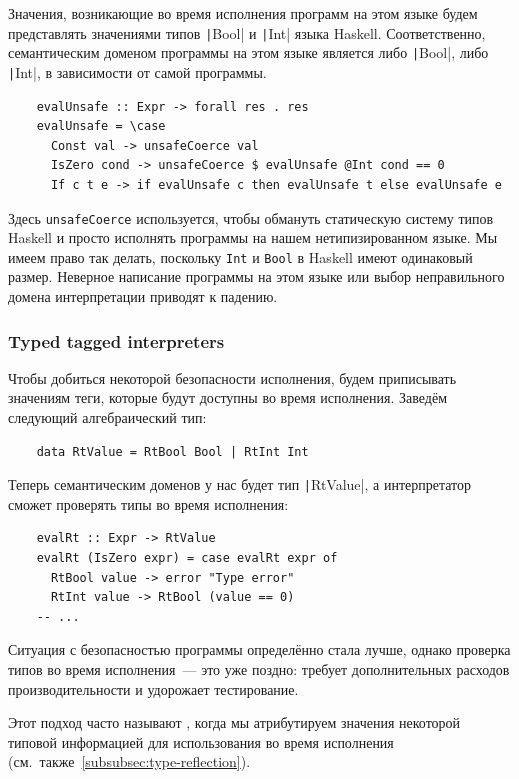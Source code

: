 Значения, возникающие во время исполнения программ на этом языке будем представлять значениями типов \texttt|Bool| и \texttt|Int| языка Haskell.
Соответственно, семантическим доменом программы на этом языке является либо \texttt|Bool|, либо \texttt|Int|, в зависимости от самой программы.
\begin{verbatim}
    evalUnsafe :: Expr -> forall res . res
    evalUnsafe = \case
      Const val -> unsafeCoerce val
      IsZero cond -> unsafeCoerce $ evalUnsafe @Int cond == 0
      If c t e -> if evalUnsafe c then evalUnsafe t else evalUnsafe e
\end{verbatim}

Здесь \texttt{unsafeCoerce} используется, чтобы обмануть статическую систему типов Haskell и просто исполнять программы на нашем нетипизированном языке.
Мы имеем право так делать, поскольку \texttt{Int} и \texttt{Bool} в Haskell имеют одинаковый размер.
Неверное написание программы на этом языке или выбор неправильного домена интерпретации приводят к падению.

\subsubsection{Typed tagged interpreters}

Чтобы добиться некоторой безопасности исполнения, будем приписывать значениям теги, которые будут доступны во время исполнения.
Заведём следующий алгебраический тип:
\begin{verbatim}
    data RtValue = RtBool Bool | RtInt Int
\end{verbatim}

Теперь семантическим доменов у нас будет тип \texttt|RtValue|, а интерпретатор сможет проверять типы во время исполнения:
\begin{verbatim}
    evalRt :: Expr -> RtValue
    evalRt (IsZero expr) = case evalRt expr of
      RtBool value -> error "Type error"
      RtInt value -> RtBool (value == 0)
    -- ...
\end{verbatim}

Ситуация с безопасностью программы определённо стала лучше, однако проверка типов во время исполнения~--- это уже поздно: требует дополнительных расходов производительности и удорожает тестирование.

Этот подход часто называют , когда мы атрибутируем значения некоторой типовой информацией для использования во время исполнения (см.\ также\ \ref{subsubsec:type-reflection}).

